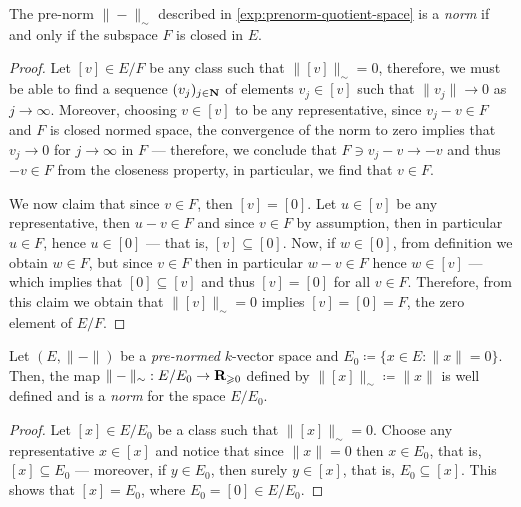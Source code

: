 \begin{proposition}
    \label{prop:quotient-norm}
    The pre-norm \(\| - \|_{\sim}\) described in \cref{exp:prenorm-quotient-space} is
    a \emph{norm} if and only if the subspace \(F\) is closed in \(E\).
\end{proposition}

\begin{proof}
    Let \([v] \in E/F\) be any class such that \(\| [v] \|_{\sim} = 0\), therefore,
    we must be able to find a sequence \((v_j)_{j \in \mathbf{N}}\) of elements \(v_j \in
    [v]\) such that \(\| v_{j} \| \to 0\) as \(j \to \infty\). Moreover, choosing
    \(v \in [v]\) to be any representative, since \(v_j - v \in F\) and \(F\) is
    closed normed space, the convergence of the norm to zero implies that \(v_j \to
    0\) for \(j \to \infty\) in \(F\) --- therefore, we conclude that \(F \ni v_j -
    v \to -v\) and thus \(-v \in F\) from the closeness property, in particular, we
    find that \(v \in F\).

    We now claim that since \(v \in F\), then \([v] = [0]\). Let \(u \in [v]\) be
    any representative, then \(u - v \in F\) and since \(v \in F\) by assumption,
    then in particular \(u \in F\), hence \(u \in [0]\) --- that is, \([v] \subseteq
    [0]\). Now, if \(w \in [0]\), from definition we obtain \(w \in F\), but since
    \(v \in F\) then in particular \(w - v \in F\) hence \(w \in [v]\) --- which
    implies that \([0] \subseteq [v]\) and thus \([v] = [0]\) for all \(v \in
    F\). Therefore, from this claim we obtain that \(\| [v] \|_{\sim} = 0\) implies
    \([v] = [0] = F\), the zero element of \(E/F\).
\end{proof}

\begin{proposition}
    \label{prop:norm-out-of-prenorm}
    Let \((E, \| - \|)\) be a \emph{pre-normed} \(k\)-vector space and \(E_0 \coloneq
    \{x \in E \colon \| x \| = 0\}\). Then, the map \(\| - \|_{\sim}: E / E_0 \to
    \mathbf{R}_{\geqslant 0}\) defined by \(\| [x] \|_{\sim} \coloneq \| x \|\) is well defined
    and is a \emph{norm} for the space \(E / E_0\).
\end{proposition}

\begin{proof}
    Let \([x] \in E / E_0\) be a class such that \(\| [x] \|_{\sim} = 0\). Choose
    any representative \(x \in [x]\) and notice that since \(\| x \| = 0\) then \(x
    \in E_0\), that is, \([x] \subseteq E_0\) --- moreover, if \(y \in E_0\), then
    surely \(y \in [x]\), that is, \(E_0 \subseteq [x]\). This shows that \([x] =
    E_0\), where \(E_0 = [0] \in E / E_0\).
\end{proof}

